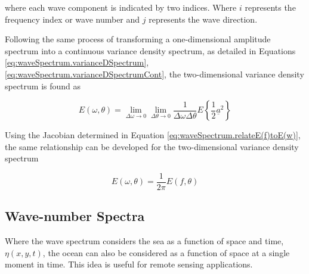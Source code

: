 where each wave component is indicated by two indices. Where $i$ represents the frequency index or wave number and $j$ represents the wave direction.

Following the same process of transforming a one-dimensional amplitude spectrum into a continuous variance density spectrum, as detailed in Equations \ref{eq:waveSpectrum.varianceDSpectrum}, \ref{eq:waveSpectrum.varianceDSpectrumCont}, the two-dimensional variance density spectrum is found as

\begin{equation} \label{eq:waveSpectrum.varianceDSpectrumCont_2D}
    E(\omega,\theta) =  \lim_{\Delta \omega \to 0}\lim_{\Delta \theta \to 0}\frac{1}{\Delta \omega \Delta \theta} E\left \{ \frac{1}{2} \underline{a}^{2}\right \}
\end{equation}

Using the Jacobian determined in Equation \ref{eq:waveSpectrum.relateE(f)toE(w)}, the same relationship can be developed for the two-dimensional variance density spectrum

\begin{equation} \label{eq:waveSpectrum.relateE(f)toE(w)_2D}
    E(\omega,\theta) =  \frac{1}{2\pi}E(f,\theta)
\end{equation}

\subsection{Wave-number Spectra} \label{subsec:theory.waves.waveNumberSpectra}
Where the wave spectrum considers the sea as a function of space and time, $\eta(x,y,t)$, the ocean can also be considered as a function of space at a single moment in time. This idea is useful for remote sensing applications.



